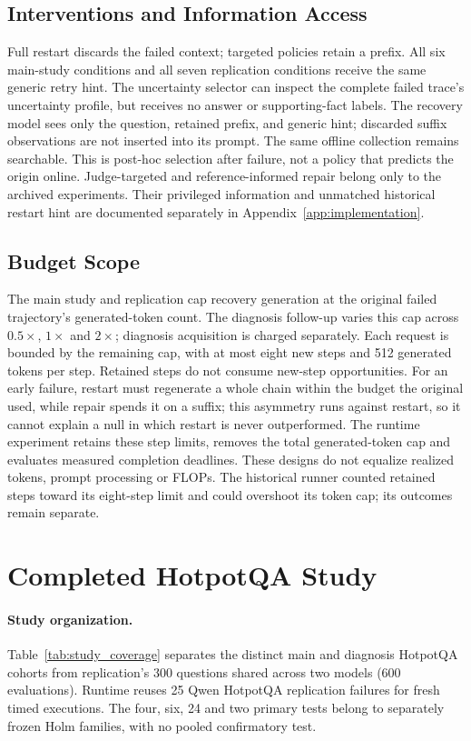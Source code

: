 \documentclass{article}
\begin{document}
\subsection{Interventions and Information Access}
Full restart discards the failed context; targeted policies retain a prefix.
All six main-study conditions and all seven replication conditions receive
the same generic retry hint. The uncertainty selector can inspect the complete failed
trace's uncertainty profile, but receives no answer or supporting-fact
labels. The recovery model sees only the question, retained prefix, and
generic hint; discarded suffix observations are not inserted into its
prompt. The same offline collection remains searchable. This is post-hoc
selection after failure, not a policy that predicts the origin online.
Judge-targeted and reference-informed repair belong only to the archived
experiments. Their privileged information and unmatched historical restart
hint are documented separately in Appendix~\ref{app:implementation}.

\subsection{Budget Scope}
The main study and replication cap recovery generation at the original failed
trajectory's generated-token count. The diagnosis follow-up varies this cap
across $0.5\times$, $1\times$ and $2\times$; diagnosis acquisition is charged
separately. Each request is bounded by the remaining cap, with at most eight
new steps and 512 generated tokens per step. Retained steps do not consume
new-step opportunities. For an early failure, restart must regenerate a whole
chain within the budget the original used, while repair spends it on a suffix;
this asymmetry runs against restart, so it cannot explain a null in which
restart is never outperformed.
The runtime experiment retains these step limits,
removes the total generated-token cap and evaluates measured completion
deadlines. These designs do not equalize realized tokens, prompt processing
or FLOPs. The historical runner counted retained steps toward its eight-step
limit and could overshoot its token cap; its outcomes remain separate.

\section{Completed HotpotQA Study}
\label{sec:evidence}
\paragraph{Study organization.}
Table~\ref{tab:study_coverage} separates the distinct main and diagnosis
HotpotQA cohorts from replication's 300 questions shared across two models
(600 evaluations). Runtime reuses 25 Qwen HotpotQA replication failures for
fresh timed executions. The four, six, 24 and two primary tests belong to
separately frozen Holm families, with no pooled confirmatory test.
\end{document}
